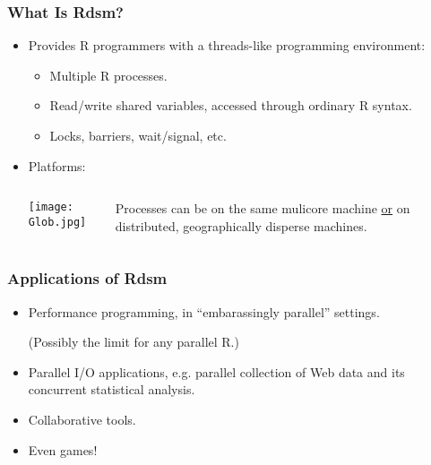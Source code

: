 \documentclass{beamer}
\begin{document}
\begin{frame}
\frametitle{What Is Rdsm?}
\pause

\begin{itemize}

\item Provides R programmers with a threads-like programming
environment:
\pause

   \begin{itemize}

   \item Multiple R processes.
   \pause
   
   \item Read/write shared variables, accessed through ordinary R syntax.
   \pause

   \item Locks, barriers, wait/signal, etc.

   \end{itemize}
   \pause

\item  Platforms:

   \begin{columns}
      \begin{column}{0.3\textwidth}
      \texttt{[image: Glob.jpg]}
      \end{column}
      \begin{column}{0.5\textwidth}
      Processes can be on the same mulicore machine \underline{or} on 
      distributed, geographically disperse machines.
      \end{column}
   \end{columns}

\end{itemize}

\end{frame}

\begin{frame}
\frametitle{Applications of Rdsm}
\pause

\begin{itemize}

\item Performance programming, in ``embarassingly parallel''
settings.  
\pause

(Possibly the limit for any parallel R.)
\pause

\item Parallel I/O applications, e.g. parallel collection of Web data and
its concurrent statistical analysis.
\pause

\item Collaborative tools.
\pause

\item Even games!

\end{itemize}
\end{frame}
\end{document}
